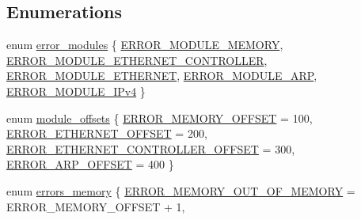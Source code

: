 \subsection*{Enumerations}
\begin{DoxyCompactItemize}
\item 
enum \mbox{\hyperlink{group__error_ga8a4a6940eb9ce245840c7e0af23a8b7c}{error\+\_\+modules}} \{ \newline
\mbox{\hyperlink{group__error_gga8a4a6940eb9ce245840c7e0af23a8b7ca504b049962309efd98dee14dda54f9f4}{E\+R\+R\+O\+R\+\_\+\+M\+O\+D\+U\+L\+E\+\_\+\+M\+E\+M\+O\+RY}}, 
\mbox{\hyperlink{group__error_gga8a4a6940eb9ce245840c7e0af23a8b7ca4d8fe7644a01433cb7e74049ff61a0be}{E\+R\+R\+O\+R\+\_\+\+M\+O\+D\+U\+L\+E\+\_\+\+E\+T\+H\+E\+R\+N\+E\+T\+\_\+\+C\+O\+N\+T\+R\+O\+L\+L\+ER}}, 
\mbox{\hyperlink{group__error_gga8a4a6940eb9ce245840c7e0af23a8b7cadf89fcb92dd25f9bb6df61655f6b0579}{E\+R\+R\+O\+R\+\_\+\+M\+O\+D\+U\+L\+E\+\_\+\+E\+T\+H\+E\+R\+N\+ET}}, 
\mbox{\hyperlink{group__error_gga8a4a6940eb9ce245840c7e0af23a8b7ca4fdef38b73a058c8d9f8ce55bad1883a}{E\+R\+R\+O\+R\+\_\+\+M\+O\+D\+U\+L\+E\+\_\+\+A\+RP}}, 
\newline
\mbox{\hyperlink{group__error_gga8a4a6940eb9ce245840c7e0af23a8b7ca5a3ae39ad1e6d703df19baff7e84be22}{E\+R\+R\+O\+R\+\_\+\+M\+O\+D\+U\+L\+E\+\_\+\+I\+Pv4}}
 \}
\item 
enum \mbox{\hyperlink{group__error_ga98346c8114f5ad4aa5cf0a2f11c15aee}{module\+\_\+offsets}} \{ \mbox{\hyperlink{group__error_gga98346c8114f5ad4aa5cf0a2f11c15aeea9868f185ecc8fb5c406ef53baad4e400}{E\+R\+R\+O\+R\+\_\+\+M\+E\+M\+O\+R\+Y\+\_\+\+O\+F\+F\+S\+ET}} = 100, 
\mbox{\hyperlink{group__error_gga98346c8114f5ad4aa5cf0a2f11c15aeeafde2d106522594f6c42922fa38a9a211}{E\+R\+R\+O\+R\+\_\+\+E\+T\+H\+E\+R\+N\+E\+T\+\_\+\+O\+F\+F\+S\+ET}} = 200, 
\mbox{\hyperlink{group__error_gga98346c8114f5ad4aa5cf0a2f11c15aeeaff9cbe74fe91ea06386fd8b3d3aca4f0}{E\+R\+R\+O\+R\+\_\+\+E\+T\+H\+E\+R\+N\+E\+T\+\_\+\+C\+O\+N\+T\+R\+O\+L\+L\+E\+R\+\_\+\+O\+F\+F\+S\+ET}} = 300, 
\mbox{\hyperlink{group__error_gga98346c8114f5ad4aa5cf0a2f11c15aeea8ea12ec718bd76d494f71875fbb7d6a7}{E\+R\+R\+O\+R\+\_\+\+A\+R\+P\+\_\+\+O\+F\+F\+S\+ET}} = 400
 \}
\item 
enum \mbox{\hyperlink{group__error_ga4d2300fd6df4ff42db6d34ca3bd63ea2}{errors\+\_\+memory}} \{ \mbox{\hyperlink{group__error_gga4d2300fd6df4ff42db6d34ca3bd63ea2a253569fc8cba5b5218d36e4e044c30cf}{E\+R\+R\+O\+R\+\_\+\+M\+E\+M\+O\+R\+Y\+\_\+\+O\+U\+T\+\_\+\+O\+F\+\_\+\+M\+E\+M\+O\+RY}} = E\+R\+R\+O\+R\+\_\+\+M\+E\+M\+O\+R\+Y\+\_\+\+O\+F\+F\+S\+ET + 1, 

\end{DoxyCompactItemize}
